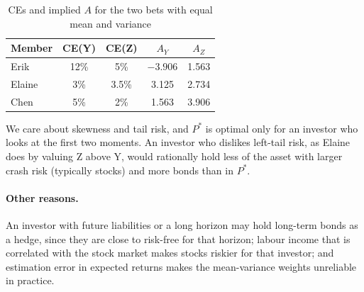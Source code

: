 \documentclass[11pt]{article}
\begin{document}
\begin{table}[H]
\centering
\caption{CEs and implied $A$ for the two bets with equal mean and variance}
\begin{tabular}{lcccc}
\toprule
Member & CE(Y) & CE(Z) & $A_Y$ & $A_Z$ \\
\midrule
Erik   & 12\% & 5\%   & $-3.906$ & 1.563 \\
Elaine & 3\%  & 3.5\% & 3.125    & 2.734 \\
Chen   & 5\%  & 2\%   & 1.563    & 3.906 \\
\bottomrule
\end{tabular}
\end{table}

\noindent We care about skewness and tail risk, and $P^*$ is optimal only for an investor who looks at the first two moments. An investor who dislikes left-tail risk, as Elaine does by valuing Z above Y, would rationally hold less of the asset with larger crash risk (typically stocks) and more bonds than in $P^*$.

\paragraph{Other reasons.}
An investor with future liabilities or a long horizon may hold long-term bonds as a hedge, since they are close to risk-free for that horizon; labour income that is correlated with the stock market makes stocks riskier for that investor; and estimation error in expected returns makes the mean-variance weights unreliable in practice.
\end{document}
